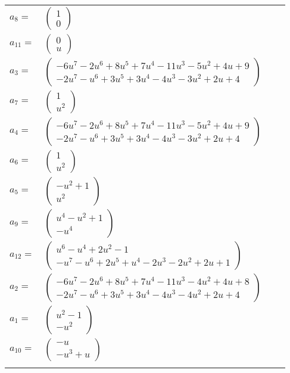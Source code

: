 \documentclass[1p]{elsarticle_modified}
\theoremstyle{definition}
\begin{document}
\begin{tabular}{m{7pt} m{180pt} m{7pt} m{180pt} }
\flushright $a_{8}=$&$\begin{pmatrix}1\\0\end{pmatrix}$ \\
\flushright $a_{11}=$&$\begin{pmatrix}0\\u\end{pmatrix}$ \\
\flushright $a_{3}=$&$\begin{pmatrix}-6 u^7-2 u^6+8 u^5+7 u^4-11 u^3-5 u^2+4 u+9\\-2 u^7- u^6+3 u^5+3 u^4-4 u^3-3 u^2+2 u+4\end{pmatrix}$ \\
\flushright $a_{7}=$&$\begin{pmatrix}1\\u^2\end{pmatrix}$ \\
\flushright $a_{4}=$&$\begin{pmatrix}-6 u^7-2 u^6+8 u^5+7 u^4-11 u^3-5 u^2+4 u+9\\-2 u^7- u^6+3 u^5+3 u^4-4 u^3-3 u^2+2 u+4\end{pmatrix}$ \\
\flushright $a_{6}=$&$\begin{pmatrix}1\\u^2\end{pmatrix}$ \\
\flushright $a_{5}=$&$\begin{pmatrix}- u^2+1\\u^2\end{pmatrix}$ \\
\flushright $a_{9}=$&$\begin{pmatrix}u^4- u^2+1\\- u^4\end{pmatrix}$ \\
\flushright $a_{12}=$&$\begin{pmatrix}u^6- u^4+2 u^2-1\\- u^7- u^6+2 u^5+u^4-2 u^3-2 u^2+2 u+1\end{pmatrix}$ \\
\flushright $a_{2}=$&$\begin{pmatrix}-6 u^7-2 u^6+8 u^5+7 u^4-11 u^3-4 u^2+4 u+8\\-2 u^7- u^6+3 u^5+3 u^4-4 u^3-4 u^2+2 u+4\end{pmatrix}$ \\
\flushright $a_{1}=$&$\begin{pmatrix}u^2-1\\- u^2\end{pmatrix}$ \\
\flushright $a_{10}=$&$\begin{pmatrix}- u\\- u^3+u\end{pmatrix}$\\&\end{tabular}
\end{document}
